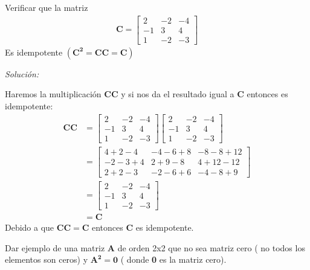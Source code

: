 \documentclass[12pt]{article}
\newenvironment{problem}[2][Problema]{\begin{trivlist}
\item[\hskip \labelsep {\bfseries #1}\hskip \labelsep {\bfseries #2.}]}{\end{trivlist}}
\newenvironment{sol}
    {\emph{Solución:}
    }
    {
    }
\begin{document}
\begin{problem}{5}
Verificar que la matriz
\begin{align*}
\mathbf{C} = 
\begin{bmatrix}
2 & -2 & -4 \\
-1 & 3 & 4 \\
1 & -2 & -3 
\end{bmatrix}
\end{align*}
Es idempotente $(\mathbf{C^2}=\mathbf{CC}=\mathbf{C})$
\end{problem}
\begin{sol}
Haremos la multiplicación $\mathbf{CC}$ y si nos da el resultado igual a $\mathbf{C}$ entonces es idempotente:
\begin{align*}
\mathbf{CC} &= 
\begin{bmatrix}
2 & -2 & -4 \\
-1 & 3 & 4 \\
1 & -2 & -3 
\end{bmatrix}
\begin{bmatrix}
2 & -2 & -4 \\
-1 & 3 & 4 \\
1 & -2 & -3 
\end{bmatrix} \\
&=
\begin{bmatrix}
4 + 2 - 4 & -4 - 6 + 8 & -8 - 8 + 12 \\
-2 - 3 + 4 & 2 + 9 - 8 & 4 + 12 - 12 \\
2 + 2 - 3 & -2 - 6 + 6 & -4 - 8 + 9
\end{bmatrix}\\
&=
\begin{bmatrix}
2 & -2 & -4 \\
-1 & 3 & 4 \\
1 & -2 & -3 
\end{bmatrix}\\
&=
\mathbf{C}
\end{align*}
Debido a que $\mathbf{CC}=\mathbf{C}$ entonces $\mathbf{C}$ es idempotente.
\end{sol}

\pagebreak

\begin{problem}{6}
Dar ejemplo de una matriz \textbf{A} de orden 2x2 que no sea matriz cero ( no todos los elementos son ceros) y $\mathbf{A^2}=\mathbf{0}$ ( donde \textbf{0} es la matriz cero).
\end{problem}
\end{document}
